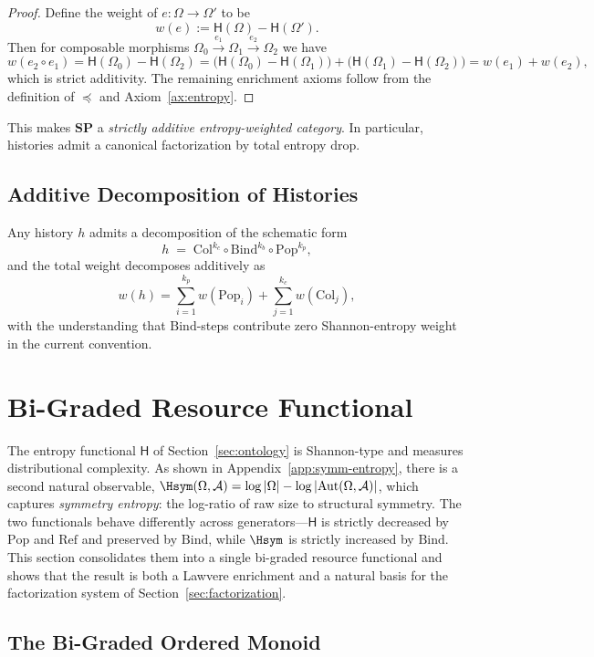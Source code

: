 \documentclass[12pt,a4paper]{article}
\theoremstyle{definition}
\theoremstyle{remark}
\newcommand{\Ent}{\ensuremath{\mathsf{H}}}
\newcommand{\SP}{\mathbf{SP}}
\newcommand{\Pop}{\ensuremath{\mathrm{Pop}}}
\newcommand{\RefOp}{\ensuremath{\mathrm{Ref}}}
\newcommand{\Bind}{\ensuremath{\mathrm{Bind}}}
\newcommand{\Col}{\ensuremath{\mathrm{Col}}}
\newcommand{\Collapse}{\Col}
\begin{document}
\begin{proof}
Define the weight of $e:\Omega\to\Omega'$ to be
\[
w(e) := \Ent(\Omega)-\Ent(\Omega').
\]
Then for composable morphisms $\Omega_0\xrightarrow{e_1}\Omega_1\xrightarrow{e_2}\Omega_2$ we have
\[
w(e_2\circ e_1)=\Ent(\Omega_0)-\Ent(\Omega_2)=\bigl(\Ent(\Omega_0)-\Ent(\Omega_1)\bigr)+\bigl(\Ent(\Omega_1)-\Ent(\Omega_2)\bigr)=w(e_1)+w(e_2),
\]
which is strict additivity. The remaining enrichment axioms follow from the definition of $\preceq$ and Axiom~\ref{ax:entropy}.
\end{proof}

This makes $\SP$ a \emph{strictly additive entropy-weighted category}. In particular, histories admit a canonical factorization by total entropy drop.

\subsection{Additive Decomposition of Histories}

Any history $h$ admits a decomposition of the schematic form
\[
h \;=\; \Collapse^{k_c}\circ \Bind^{k_b}\circ \Pop^{k_p},
\]
and the total weight decomposes additively as
\[
w(h)
=\sum_{i=1}^{k_p} w(\Pop_i) + \sum_{j=1}^{k_c} w(\Collapse_j),
\]
with the understanding that $\Bind$-steps contribute zero Shannon-entropy weight in the current convention.


\section{Bi-Graded Resource Functional}
\label{sec:bigraded}

The entropy functional $\Ent$ of Section~\ref{sec:ontology} is Shannon-type and
measures distributional complexity. As shown in Appendix~\ref{app:symm-entropy},
there is a second natural observable, $\Hsym(\Omega,\mathcal{A})=\log|\Omega|
-\log|\mathrm{Aut}(\Omega,\mathcal{A})|$, which captures \emph{symmetry entropy}:
the log-ratio of raw size to structural symmetry. The two functionals behave
differently across generators—$\Ent$ is strictly decreased by $\Pop$ and $\RefOp$
and preserved by $\Bind$, while $\Hsym$ is strictly increased by $\Bind$. This
section consolidates them into a single bi-graded resource functional and shows
that the result is both a Lawvere enrichment and a natural basis for the
factorization system of Section~\ref{sec:factorization}.

\subsection{The Bi-Graded Ordered Monoid}
\end{document}

